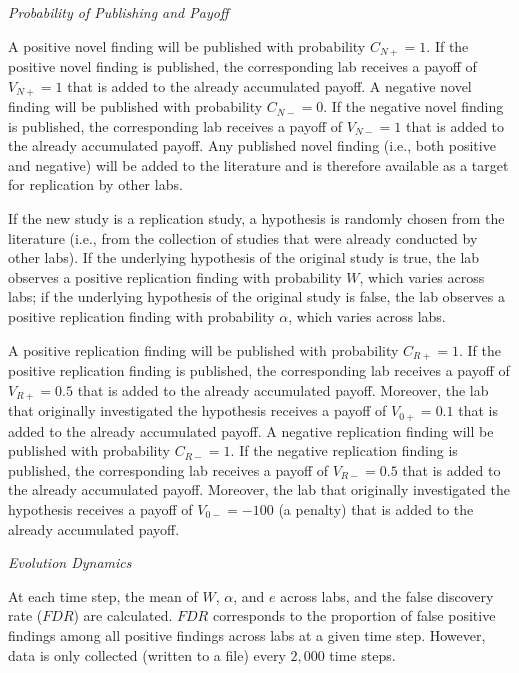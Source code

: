 \documentclass[meta, authordate,issue]{jote-new-article}
\begin{document}
\begin{adjustwidth}{-4cm}{}
\begin{tcolorbox}
{      \vspace*{\baselineskip}
      \noindent\emph{Probability of Publishing and Payoff}
      \vspace*{\baselineskip}

      \noindent A positive novel finding will be published with probability $C_{N+}=1$. If the positive novel finding is published, the corresponding lab receives a payoff of $V_{N+}=1$ that is added to the already accumulated payoff. A negative novel finding will be published with probability $C_{N-}=0$. If the negative novel finding is published, the corresponding lab receives a payoff of $V_{N-}=1$ that is added to the already accumulated payoff. Any published novel finding (i.e., both positive and negative) will be added to the literature and is therefore available as a target for replication by other labs.

      If the new study is a replication study, a hypothesis is randomly chosen from the literature (i.e., from the collection of studies that were already conducted by other labs). If the underlying hypothesis of the original study is true, the lab observes a positive replication finding with probability $W$, which varies across labs; if the underlying hypothesis of the original study is false, the lab observes a positive replication finding with probability $\alpha$, which varies across labs.

      A positive replication finding will be published with probability $C_{R+}=1$. If the positive replication finding is published, the corresponding lab receives a payoff of $V_{R+}=0.5$ that is added to the already accumulated payoff. Moreover, the lab that originally investigated the hypothesis receives a payoff of $V_{0+}=0.1$ that is added to the already accumulated payoff. A negative replication finding will be published with probability $C_{R-}=1$. If the negative replication finding is published, the corresponding lab receives a payoff of $V_{R-}=0.5$ that is added to the already accumulated payoff. Moreover, the lab that originally investigated the hypothesis receives a payoff of $V_{0-}=-100$ (a penalty) that is added to the already accumulated payoff.

      \vspace*{\baselineskip}
      \noindent\emph{Evolution Dynamics}
      \vspace*{\baselineskip}

      \noindent At each time step, the mean of $W$, $\alpha$, and $e$ across labs, and the false discovery rate ($FDR$) are calculated. $FDR$ corresponds to the proportion of false positive findings among all positive findings across labs at a given time step. However, data is only collected (written to a file) every $2,000$ time steps.

}
\end{tcolorbox}
\end{adjustwidth}
\end{document}
